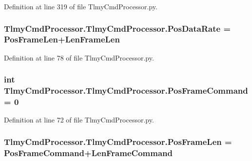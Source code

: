Definition at line 319 of file Tlmy\+Cmd\+Processor.\+py.

\hypertarget{namespace_tlmy_cmd_processor_1_1_tlmy_cmd_processor_a76d473c0c6d81f0ebbf3de7c2e66e65c}{}
\subsubsection[{Pos\+Data\+Rate}]{\setlength{\rightskip}{0pt plus 5cm}Tlmy\+Cmd\+Processor.\+Tlmy\+Cmd\+Processor.\+Pos\+Data\+Rate = {\bf Pos\+Frame\+Len}+{\bf Len\+Frame\+Len}}\label{namespace_tlmy_cmd_processor_1_1_tlmy_cmd_processor_a76d473c0c6d81f0ebbf3de7c2e66e65c}


Definition at line 78 of file Tlmy\+Cmd\+Processor.\+py.

\hypertarget{namespace_tlmy_cmd_processor_1_1_tlmy_cmd_processor_a88e5624ffdbb481998f56fc73359de9a}{}
\subsubsection[{Pos\+Frame\+Command}]{\setlength{\rightskip}{0pt plus 5cm}int Tlmy\+Cmd\+Processor.\+Tlmy\+Cmd\+Processor.\+Pos\+Frame\+Command = 0}\label{namespace_tlmy_cmd_processor_1_1_tlmy_cmd_processor_a88e5624ffdbb481998f56fc73359de9a}


Definition at line 72 of file Tlmy\+Cmd\+Processor.\+py.

\hypertarget{namespace_tlmy_cmd_processor_1_1_tlmy_cmd_processor_a8d0363eccf14b5a5864f22854a033bc6}{}
\subsubsection[{Pos\+Frame\+Len}]{\setlength{\rightskip}{0pt plus 5cm}Tlmy\+Cmd\+Processor.\+Tlmy\+Cmd\+Processor.\+Pos\+Frame\+Len = {\bf Pos\+Frame\+Command}+{\bf Len\+Frame\+Command}}\label{namespace_tlmy_cmd_processor_1_1_tlmy_cmd_processor_a8d0363eccf14b5a5864f22854a033bc6}


